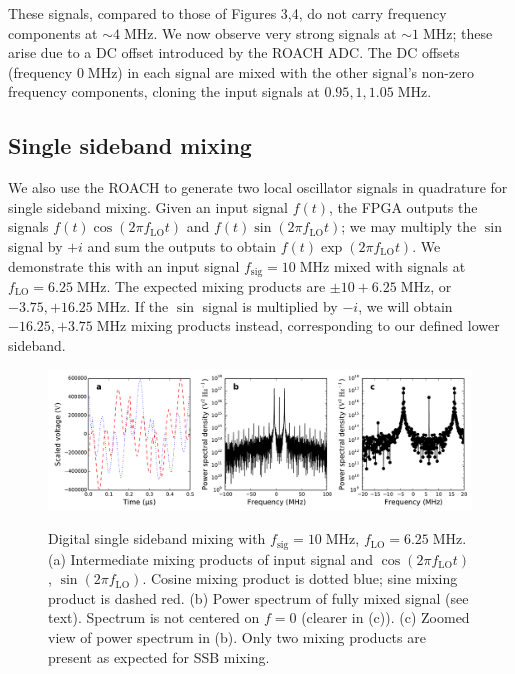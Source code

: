\documentclass[11pt]{article}
\newcommand {\mt}{\mathrm}
\newcommand {\unit}[1]{\; \mt{#1}}
\begin{document}
These signals, compared to those of Figures 3,4, do not carry frequency
components at $\sim 4 \unit{MHz}$.  We now observe very strong signals
at $\sim 1 \unit{MHz}$; these arise due to a DC offset introduced by the ROACH
ADC.  The DC offsets (frequency $0 \unit{MHz}$) in each signal are mixed with
the other signal's non-zero frequency components, cloning the input signals at
$0.95, 1, 1.05 \unit{MHz}$.

\subsection{Single sideband mixing}

We also use the ROACH to generate two local oscillator signals in quadrature
for single sideband mixing.  Given an input signal $f(t)$, the FPGA outputs
the signals $f(t) \cos (2\pi f_{\mt{LO}} t)$ and
$f(t) \sin (2\pi f_{\mt{LO}} t)$; we may multiply the $\sin$ signal by $+i$
and sum the outputs to obtain $f(t) \exp\left( 2\pi f_{\mt{LO}} t \right)$.
We demonstrate this with an input signal
$f_{\mt{sig}} = 10 \unit{MHz}$ mixed with signals at
$f_{\mt{LO}} = 6.25 \unit{MHz}$.  The expected mixing products are $\pm 10 +
6.25 \unit{MHz}$, or $-3.75, +16.25 \unit{MHz}$.  If the $\sin$ signal is
multiplied by $-i$, we will obtain $-16.25, +3.75 \unit{MHz}$ mixing products
instead, corresponding to our defined lower sideband.

\begin{figure}[!htb]
    \centering
    \includegraphics[width=\textwidth]{scripts/digital_mixing_SSB.pdf} \\
    \caption{Digital single sideband mixing with $f_{\mt{sig}} = 10\unit{MHz}$,
    $f_{\mt{LO}} = 6.25 \unit{MHz}$.  (a) Intermediate mixing products of input
    signal and $\cos(2\pi f_{\mt{LO}} t)$, $\sin(2\pi f_{\mt{LO}})$.  Cosine
    mixing product is dotted blue; sine mixing product is dashed red.
    (b) Power spectrum of fully mixed signal (see text).  Spectrum is not
    centered on $f=0$ (clearer in (c)).
    (c) Zoomed view of power spectrum in (b).  Only two mixing products are
    present as expected for SSB mixing.}
\end{figure}
\end{document}
